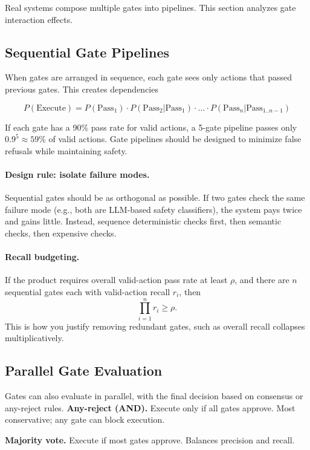 Real systems compose multiple gates into pipelines. This section analyzes gate interaction effects.

\subsection{Sequential Gate Pipelines}

When gates are arranged in sequence, each gate sees only actions that passed previous gates. This creates dependencies

\[
P(\text{Execute}) = P(\text{Pass}_1) \cdot P(\text{Pass}_2 | \text{Pass}_1) \cdot \ldots \cdot P(\text{Pass}_n | \text{Pass}_{1..n-1})
\]

If each gate has a 90\% pass rate for valid actions, a 5-gate pipeline passes only $0.9^5 \approx 59\%$ of valid actions. Gate pipelines should be designed to minimize false refusals while maintaining safety.

\paragraph{Design rule: isolate failure modes.}
Sequential gates should be as orthogonal as possible. If two gates check the same failure mode (e.g., both are LLM-based safety classifiers), the system pays twice and gains little. Instead, sequence deterministic checks first, then semantic checks, then expensive checks.

\paragraph{Recall budgeting.}
If the product requires overall valid-action pass rate at least $\rho$, and there are $n$ sequential gates each with valid-action recall $r_i$, then
\[
\prod_{i=1}^n r_i \ge \rho.
\]
This is how you justify removing redundant gates, such as overall recall collapses multiplicatively.

\subsection{Parallel Gate Evaluation}

Gates can also evaluate in parallel, with the final decision based on consensus or any-reject rules. \textbf{Any-reject (AND).} Execute only if all gates approve. Most conservative; any gate can block execution.

\textbf{Majority vote.} Execute if most gates approve. Balances precision and recall.

